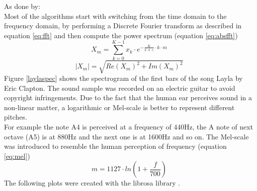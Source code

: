 As done by: \cite[pp. 17ff]{schnitzer1}\\
Most of the algorithms start with switching from the time domain to the frequency domain, by performing a Discrete Fourier transform as described in equation \ref{eq:fft} and then compute the power spectrum (equation \ref{eq:absfft})
\begin{equation} \label{eq:fft}
X_m = \sum_{k=0}^{K-1}{x_k \cdot e^ { - \frac{K}{ 2 \cdot \pi \cdot i}\cdot k\cdot m}}
\end{equation}
\begin{equation} \label{eq:absfft}
|X_m| = \sqrt{Re(X_m)^2 + Im(X_m)^2}
\end{equation}
Figure \ref{laylaspec} shows the spectrogram of the first bars of the song Layla by Eric Clapton. The sound sample was recorded on an electric guitar to avoid copyright infringements. 
Due to the fact that the human ear perceives sound in a non-linear matter, a logarithmic or Mel-scale is better to represent different pitches.\\ 
For example the note A4 is perceived at a frequency of 440Hz, the A note of next octave (A5) is at 880Hz and the next one is at 1600Hz and so on. 
The Mel-scale \cite[pp. 53f]{knees1} was introduced to resemble the human perception of frequency (equation \ref{eq:mel})
\begin{equation} \label{eq:mel}
m = 1127 \cdot ln(1 + \frac{f}{700})
\end{equation}
The following plots were created with the librosa library \cite{librosa1}.

